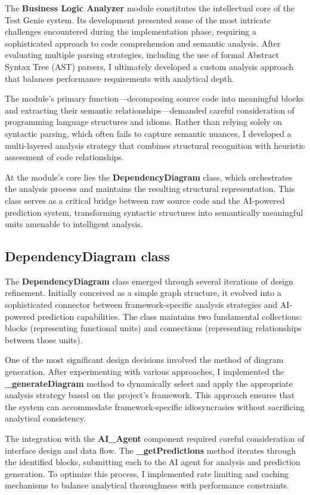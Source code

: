 The \textbf{Business Logic Analyzer} module constitutes the intellectual core of the Test Genie system. Its development presented some of the most intricate challenges encountered during the implementation phase, requiring a sophisticated approach to code comprehension and semantic analysis. After evaluating multiple parsing strategies, including the use of formal Abstract Syntax Tree (AST) parsers, I ultimately developed a custom analysis approach that balances performance requirements with analytical depth.

The module's primary function—decomposing source code into meaningful blocks and extracting their semantic relationships—demanded careful consideration of programming language structures and idioms. Rather than relying solely on syntactic parsing, which often fails to capture semantic nuances, I developed a multi-layered analysis strategy that combines structural recognition with heuristic assessment of code relationships.

At the module's core lies the \textbf{DependencyDiagram} class, which orchestrates the analysis process and maintains the resulting structural representation. This class serves as a critical bridge between raw source code and the AI-powered prediction system, transforming syntactic structures into semantically meaningful units amenable to intelligent analysis.

\subsection{DependencyDiagram class}

The \textbf{DependencyDiagram} class emerged through several iterations of design refinement. Initially conceived as a simple graph structure, it evolved into a sophisticated connector between framework-specific analysis strategies and AI-powered prediction capabilities. The class maintains two fundamental collections: blocks (representing functional units) and connections (representing relationships between those units).

One of the most significant design decisions involved the method of diagram generation. After experimenting with various approaches, I implemented the \textbf{\_generateDiagram} method to dynamically select and apply the appropriate analysis strategy based on the project's framework. This approach ensures that the system can accommodate framework-specific idiosyncrasies without sacrificing analytical consistency.

The integration with the \textbf{AI\_Agent} component required careful consideration of interface design and data flow. The \textbf{\_getPredictions} method iterates through the identified blocks, submitting each to the AI agent for analysis and prediction generation. To optimize this process, I implemented rate limiting and caching mechanisms to balance analytical thoroughness with performance constraints.


